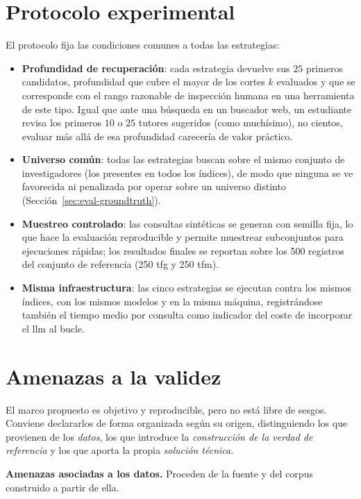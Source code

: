 \section{Protocolo experimental}
\label{sec:eval-protocolo}

El protocolo fija las condiciones comunes a todas las estrategias:

\begin{itemize}
    \item \textbf{Profundidad de recuperación}: cada estrategia devuelve sus $25$ primeros candidatos, profundidad que cubre el mayor de los cortes $k$ evaluados y que se corresponde con el rango razonable de inspección humana en una herramienta de este tipo. Igual que ante una búsqueda en un buscador web, un estudiante revisa los primeros $10$ o $25$ tutores sugeridos (como muchísimo), no cientos, evaluar más allá de esa profundidad carecería de valor práctico.
    \item \textbf{Universo común}: todas las estrategias buscan sobre el mismo conjunto de investigadores (los presentes en todos los índices), de modo que ninguna se ve favorecida ni penalizada por operar sobre un universo distinto (Sección~\ref{sec:eval-groundtruth}).
    \item \textbf{Muestreo controlado}: las consultas sintéticas se generan con semilla fija, lo que hace la evaluación reproducible y permite muestrear subconjuntos para ejecuciones rápidas; los resultados finales se reportan sobre los 500 registros del conjunto de referencia (250 \gls{tfg} y 250 \gls{tfm}).
    \item \textbf{Misma infraestructura}: las cinco estrategias se ejecutan contra los mismos índices, con los mismos modelos y en la misma máquina, registrándose también el tiempo medio por consulta como indicador del coste de incorporar el \gls{llm} al bucle.
\end{itemize}

\section{Amenazas a la validez}
\label{sec:eval-validez}

El marco propuesto es objetivo y reproducible, pero no está libre de sesgos.
Conviene declararlos de forma organizada según su origen, distinguiendo los que provienen de los \emph{datos}, los que introduce la \emph{construcción de la verdad de referencia} y los que aporta la propia \emph{solución técnica}.

\textbf{Amenazas asociadas a los datos.} Proceden de la fuente y del corpus construido a partir de ella.

